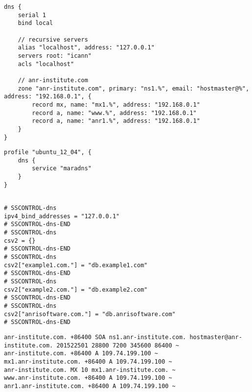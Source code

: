 \begin{lstlisting}[style=Java,label=lst:dns_example_script,
title={Dns example script.}]
dns {
    serial 1
    bind local

    // recursive servers
    alias "localhost", address: "127.0.0.1"
    servers root: "icann"
    acls "localhost"

    // anr-institute.com
    zone "anr-institute.com", primary: "ns1.%", email: "hostmaster@%", address: "192.168.0.1", {
        record mx, name: "mx1.%", address: "192.168.0.1"
        record a, name: "www.%", address: "192.168.0.1"
        record a, name: "anr1.%", address: "192.168.0.1"
    }
}
\end{lstlisting}

\begin{lstlisting}[style=Java,label=lst:dns_ubuntu_profile_min,
title={Minimal Ubuntu MaraDNS profile, only the DNS service type is needed. The other profile properties are set to default values.}]
profile "ubuntu_12_04", {
    dns {
        service "maradns"
    }
}
\end{lstlisting}

\begin{lstlisting}[style=rcfile_nonumbers,
label=lst:dns_mararc_example,
title={Example MaraDNS configuration file that is created from the DNS profile 
and script. The file is saved as /etc/maradns/mararc}]

# SSCONTROL-dns
ipv4_bind_addresses = "127.0.0.1"
# SSCONTROL-dns-END
# SSCONTROL-dns
csv2 = {}
# SSCONTROL-dns-END
# SSCONTROL-dns
csv2["example1.com."] = "db.example1.com"
# SSCONTROL-dns-END
# SSCONTROL-dns
csv2["example2.com."] = "db.example2.com"
# SSCONTROL-dns-END
# SSCONTROL-dns
csv2["anrisoftware.com."] = "db.anrisoftware.com"
# SSCONTROL-dns-END
\end{lstlisting}

\begin{lstlisting}[style=rcfile_nonumbers,
label=lst:dns_zone1_example,
title={Example MaraDNS zone configuration file that is created from the 
DNS script. The file is saved as /etc/maradns/db.anrisoftware.com}]
anr-institute.com. +86400 SOA ns1.anr-institute.com. hostmaster@anr-institute.com. 201522501 28800 7200 345600 86400 ~
anr-institute.com. +86400 A 109.74.199.100 ~
mx1.anr-institute.com. +86400 A 109.74.199.100 ~
anr-institute.com. MX 10 mx1.anr-institute.com. ~
www.anr-institute.com. +86400 A 109.74.199.100 ~
anr1.anr-institute.com. +86400 A 109.74.199.100 ~
\end{lstlisting}

